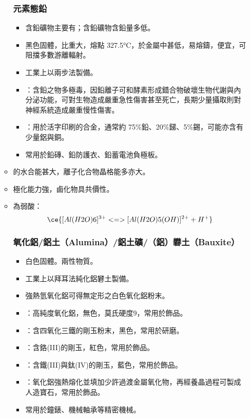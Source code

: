 \documentclass[a4paper,12pt]{report}
\begin{document}
\begin{itemize}
\begin{itemize}
\subsubsection{元素態鉛}
\begin{itemize}
\item 含鉛礦物主要有；含鉛礦物含鉛量多低。
\item 黑色固體，比重大，熔點 327.5°C，於金屬中甚低，易熔鑄，便宜，可阻擋多數游離輻射。
\item 工業上以兩步法製備。
\item {}：含鉛之物多極毒，因鉛離子可和酵素形成錯合物破壞生物代謝與內分泌功能，可對生物造成嚴重急性傷害甚至死亡，長期少量攝取則對神經系統造成嚴重慢性傷害。
\item {}：用於活字印刷的合金，通常約 75\%鉛、20\%銻、5\%錫，可能亦含有少量鋁與銅。
\item 常用於鉛磚、鉛防護衣、鉛蓄電池負極板。
\end{itemize}
\bit
\item {}的水合能甚大，離子化合物晶格能多亦大。
\item {}極化能力強，鹵化物具共價性。
\item {}為弱酸：
\[\ce{[Al(H2O)6]^{3+} <=> [Al(H2O)5(OH)]^{2+} + H^+}\]
\eit
\subsubsection{氧化鋁/鋁土（Alumina）/鋁土礦/（鋁）礬土（Bauxite）}
\begin{itemize}
\item 白色固體。兩性物質。
\item 工業上以拜耳法純化鋁礬土製備。
\item 強熱氫氧化鋁可得無定形之白色氧化鋁粉末。
\item {}：高純度氧化鋁，無色，莫氏硬度9，常用於飾品。
\item {}：含四氧化三鐵的剛玉粉末，黑色，常用於研磨。
\item {}：含鉻(III)的剛玉，紅色，常用於飾品。
\item {}：含鐵(III)與鈦(IV)的剛玉，藍色，常用於飾品。
\item {}：氧化鋁強熱熔化並填加少許過渡金屬氧化物，再經養晶過程可製成人造寶石，常用於飾品。
\item 常用於鐘錶、機械軸承等精密機械。
\end{itemize}

\end{itemize}
\end{itemize}
\end{document}
